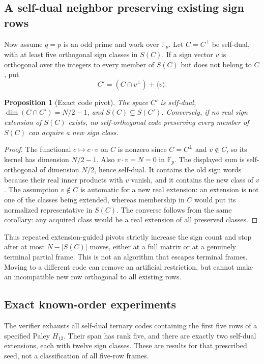 \documentclass[11pt]{article}
\newtheorem{proposition}[theorem]{Proposition}
\begin{document}
\subsection{A self-dual neighbor preserving existing sign rows}
Now assume $q=p$ is an odd prime and work over $\mathbb F_p$.
Let $C=C^\perp$ be self-dual, with at least five orthogonal sign
classes in $S(C)$. If a sign vector $v$ is orthogonal over the
integers to every member of $S(C)$ but does not belong to $C$, put
\[
 C'=(C\cap v^\perp)+\langle v\rangle.
\]
\begin{proposition}[Exact code pivot]\label{code:pivot}
The space $C'$ is self-dual, $\dim(C\cap C')=N/2-1$, and
$S(C)\subsetneq S(C')$. Conversely, if no real sign extension of
$S(C)$ exists, no self-orthogonal code preserving every member
of $S(C)$ can acquire a new sign class.
\end{proposition}
\begin{proof}
The functional $c\mapsto c\cdot v$ on $C$ is nonzero since
$C=C^\perp$ and $v\notin C$, so its kernel has dimension $N/2-1$.
Also $v\cdot v=N=0$ in $\mathbb F_p$. The displayed sum is
self-orthogonal of dimension $N/2$, hence self-dual.
It contains the old sign words because their real inner products
with $v$ vanish, and it contains the new class of $v$.
The assumption $v\notin C$ is automatic for a new real extension:
an extension is not one of the classes being extended, whereas
membership in $C$ would put its normalized representative in $S(C)$.
The converse follows from the same corollary: any acquired class
would be a real extension of all preserved classes.
\end{proof}

Thus repeated extension-guided pivots strictly increase the sign
count and stop after at most $N-|S(C)|$ moves, either at a full matrix
or at a genuinely terminal partial frame. This is not an algorithm
that escapes terminal frames. Moving to a different code can remove
an artificial restriction, but cannot make an incompatible new row
orthogonal to all existing rows.

\subsection{Exact known-order experiments}
The verifier exhausts all self-dual ternary codes containing the
first five rows of a specified Paley $H_{12}$. Their span has rank
five, and there are exactly two self-dual extensions, each with
twelve sign classes. These are results for that prescribed seed,
not a classification of all five-row frames.
\end{document}
